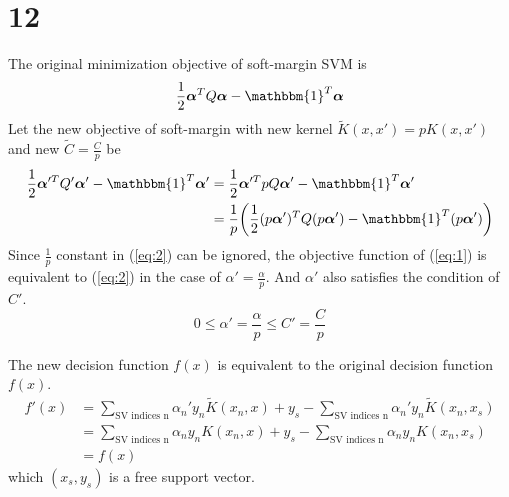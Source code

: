 \documentclass[12pt]{article}
\begin{document}
\section*{12}
The original minimization objective of soft-margin SVM is
\begin{equation} \label{eq:1}
    \frac{1}{2} \bm{\alpha}^T Q \bm{\alpha} - \mathbbm{1}^T \bm{\alpha}
\end{equation}
Let the new objective of soft-margin with new kernel $\tilde{K} (x, x') = pK(x, x')$ and new $\tilde{C} = \frac{C}{p}$ be
\begin{equation} \label{eq:2}
    \begin{split}
        \frac{1}{2} \bm{\alpha}'^T Q' \bm{\alpha}' - \mathbbm{1}^T \bm{\alpha}' 
        &= \frac{1}{2} \bm{\alpha}'^T pQ \bm{\alpha}' - \mathbbm{1}^T \bm{\alpha}' \\
        &= \frac{1}{p} \bigg( \frac{1}{2} (p\bm{\alpha}')^T Q (p\bm{\alpha}') - \mathbbm{1}^T (p\bm{\alpha}') \bigg)
    \end{split}
\end{equation}
Since $\frac{1}{p}$ constant in (\ref{eq:2}) can be ignored, the objective function of (\ref{eq:1}) is equivalent to (\ref{eq:2}) in the case of $\alpha' = \frac{\alpha}{p}$. And $\alpha'$ also satisfies the condition of $C'$.
\begin{equation*}
    0 \leq \alpha' = \frac{\alpha}{p} \leq C' = \frac{C}{p} 
\end{equation*}

The new decision function $f(x)$ is equivalent to the original decision function $f(x)$. 
\begin{equation*}
\begin{split}
    f'(x) &= \sum_{\text{SV indices n}} \alpha_n' y_n \tilde{K}(x_n, x) + y_s - \sum_{\text{SV indices n}} \alpha_n' y_n \tilde{K}(x_n, x_s) \\
    &= \sum_{\text{SV indices n}} \alpha_n y_n K(x_n, x) + y_s - \sum_{\text{SV indices n}} \alpha_n y_n K(x_n, x_s) \\
    &= f(x)
\end{split}
\end{equation*}
which $(x_s, y_s)$ is a free support vector.
\end{document}
